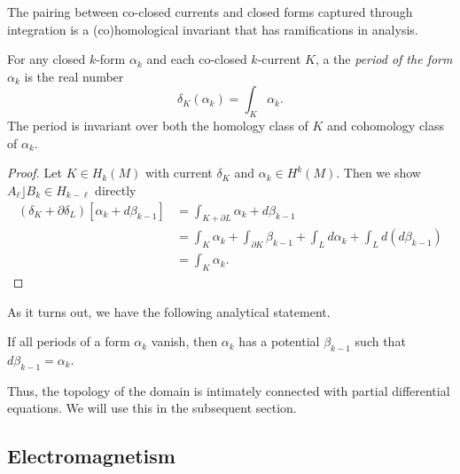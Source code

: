 \documentclass[conf]{new-aiaa}
\begin{document}
The pairing between co-closed currents and closed forms captured through integration is a (co)homological invariant that has ramifications in analysis.
\begin{proposition}
\label{def:period}
For any closed $k$-form $\alpha_k$ and each co-closed $k$-current $K$, a the \emph{period of the form $\alpha_k$} is the real number
\begin{equation}
\delta_K(\alpha_k)=\int_K \alpha_k.
\end{equation}
The period is invariant over both the homology class of $K$ and cohomology class of $\alpha_k$.
\end{proposition}
\begin{proof}
Let $K \in H_k(M)$ with current $\delta_K$ and $\alpha_k \in H^k(M)$. Then we show $A_\ell \rfloor B_k \in H_{k-\ell}$ directly
\begin{align}
(\delta_K+\partial \delta_L)[\alpha_k + d \beta_{k-1}] &= \int_{K+\partial L} \alpha_k + d\beta_{k-1}\\
&= \int_K \alpha_k + \int_{\partial K} \beta_{k-1} + \int_L d \alpha_k + \int_L d(d\beta_{k-1})\\
&= \int_K \alpha_k.
\end{align}
\end{proof}
As it turns out, we have the following analytical statement.
\begin{proposition}
\label{prop:periods}
    If all periods of a form $\alpha_k$ vanish, then $\alpha_k$ has a potential $\beta_{k-1}$ such that $d\beta_{k-1}=\alpha_k$.
\end{proposition}
Thus, the topology of the domain is intimately connected with partial differential equations. We will use this in the subsequent section.

\subsection{Electromagnetism}
\end{document}
